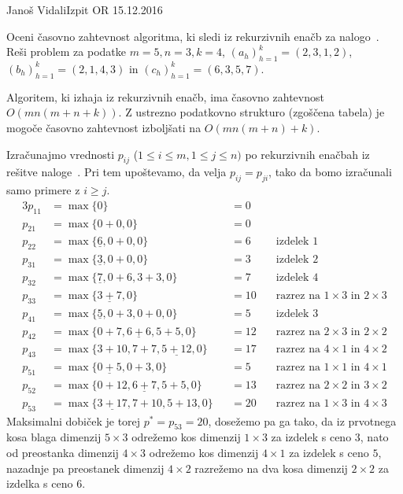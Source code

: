 \begin{naloga}{Janoš Vidali}{Izpit OR 15.12.2016}
\begin{vprasanje}
Oceni časovno zahtevnost algoritma,
ki sledi iz rekurzivnih enačb za nalogo~\nal[blago].
Reši problem za podatke $m = 5, n = 3, k = 4$,
$(a_h)_{h=1}^k = (2, 3, 1, 2)$, $(b_h)_{h=1}^k = (2, 1, 4, 3)$
in $(c_h)_{h=1}^k = (6, 3, 5, 7)$.
\end{vprasanje}

\begin{odgovor}
Algoritem, ki izhaja iz rekurzivnih enačb,
ima časovno zahtevnost $O(mn(m + n + k))$.
Z ustrezno podatkovno strukturo (zgoščena tabela)
je mogoče časovno zahtevnost izboljšati na $O(mn(m + n) + k)$.

Izračunajmo vrednosti $p_{ij}$ ($1 \le i \le m, 1 \le j \le n)$
po rekurzivnih enačbah iz rešitve naloge~\res[blago].
Pri tem upoštevamo, da velja $p_{ij} = p_{ji}$,
tako da bomo izračunali samo primere z $i \ge j$.
\begin{alignat*}{3}
p_{11} &= \max\{0\} &&= 0 \\
p_{21} &= \max\{0 + 0, 0\} &&= 0 \\
p_{22} &= \max\{\underline{6}, 0 + 0, 0\} &&= 6 &\quad \text{izdelek $1$} \\
p_{31} &= \max\{\underline{3}, 0 + 0, 0\} &&=3 &\quad \text{izdelek $2$} \\
p_{32} &= \max\{\underline{7}, 0 + 6, 3 + 3, 0\} &&=7 &\quad \text{izdelek $4$} \\
p_{33} &= \max\{\underline{3 + 7}, 0\} &&= 10 &\quad \text{razrez na $1 \times 3$ in $2 \times 3$} \\
p_{41} &= \max\{\underline{5}, 0 + 3, 0 + 0, 0\} &&=5 &\quad \text{izdelek $3$} \\
p_{42} &= \max\{0 + 7, \underline{6 + 6}, 5 + 5, 0\} &&= 12 &\quad \text{razrez na $2 \times 3$ in $2 \times 2$} \\
p_{43} &= \max\{3 + 10, 7 + 7, \underline{5 + 12}, 0\} &&= 17 &\quad \text{razrez na $4 \times 1$ in $4 \times 2$} \\
p_{51} &= \max\{\underline{0 + 5}, 0 + 3, 0\} &&=5 &\quad \text{razrez na $1 \times 1$ in $4 \times 1$} \\
p_{52} &= \max\{0 + 12, \underline{6 + 7}, 5 + 5, 0\} &&= 13 &\quad \text{razrez na $2 \times 2$ in $3 \times 2$} \\
p_{53} &= \max\{\underline{3 + 17}, 7 + 10, 5 + 13, 0\} &&= 20 &\quad \text{razrez na $1 \times 3$ in $4 \times 3$}
\end{alignat*}
Maksimalni dobiček je torej $p^* = p_{53} = 20$, dosežemo pa ga tako,
da iz prvotnega kosa blaga dimenzij $5 \times 3$
odrežemo kos dimenzij $1 \times 3$ za izdelek s ceno $3$,
nato od preostanka dimenzij $4 \times 3$
odrežemo kos dimenzij $4 \times 1$ za izdelek s ceno $5$,
nazadnje pa preostanek dimenzij $4 \times 2$
razrežemo na dva kosa dimenzij $2 \times 2$ za izdelka s ceno $6$.
\end{odgovor}
\end{naloga}
